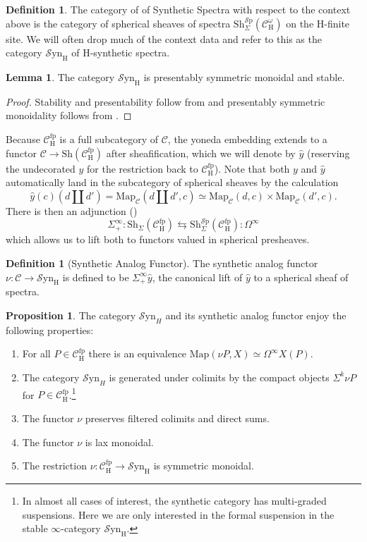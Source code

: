 \documentclass[10pt]{amsart}
\theoremstyle{definition}
\numberwithin{figure}{section}
\numberwithin{equation}{section}
\newtheorem{lemma}[figure]{Lemma}
\newtheorem{proposition}[figure]{Proposition}
\newtheorem{definition}[figure]{Definition}
\newcommand{\cC}{\mathcal{C}}
\theoremstyle{cited}
\newcommand{\Sp}{{\mathcal{S}\mathrm{p}}}
\newcommand{\Map}{\mathrm{Map}}
\newcommand{\Sh}{\mathrm{Sh}}
\newcommand{\fp}{\mathrm{fp}}
\newcommand{\Syn}{\mathcal{S}\mathrm{yn}}
\renewcommand{\H}{\mathrm{H}}
\begin{document}
\begin{definition}\label{def:synsp}
  The category of of Synthetic Spectra with respect to the context above is the category of spherical sheaves of spectra $\Sh^\Sp_\Sigma(\cC^\omega_\H)$ on the $\H$-finite site. We will often drop much of the context data and refer to this as the category $\Syn_\H$ of $\H$-synthetic spectra.
\end{definition}

\begin{lemma}\label{lem:synispsms}
  The category $\Syn_\H$ is presentably symmetric monoidal and stable.
\end{lemma}

\begin{proof}
  Stability and presentability follow from \cite[Corollary 2.13]{Pst22} and presentably symmetric monoidality follows from \cite[Proposition 2.30]{Pst22}.
\end{proof}

Because $\cC_\H^\fp$ is a full subcategory of $\cC$, the yoneda embedding extends to a functor $\cC\to \Sh(\cC_\H^\fp)$ after sheafification, which we will denote by $\hat y$ (reserving the undecorated $y$ for the restriction back to $\cC^\fp_\H$). Note that both $y$ and $\hat y$ automatically land in the subcategory of spherical sheaves by the calculation
\[
  \hat y(c)(d\amalg d')=\Map_{\cC}(d\amalg d', c)\simeq \Map_{\cC}(d, c)\times \Map_{\cC}(d', c).
\]
There is then an adjunction (\cite{Pst22})
\[
\Sigma^\infty_+:\Sh_\Sigma(\cC_\H^\fp) \leftrightarrows \Sh_\Sigma^\Sp(\cC_\H^\fp):\Omega^\infty
\]
which allows us to lift both to functors valued in spherical presheaves.

\begin{definition}[Synthetic Analog Functor]\label{def:synanalog}
  The synthetic analog functor $\nu:\cC\to \Syn_\H$ is defined to be $\Sigma_+^\infty \hat y$, the canonical lift of $\hat y$ to a spherical sheaf of spectra.
\end{definition}

\begin{proposition}\label{prop:analogprops}
   The category $\Syn_H$ and its synthetic analog functor enjoy the following properties:
   \begin{enumerate}
    \item For all $P\in \cC_\H^\fp$ there is an equivalence $\Map(\nu P, X)\simeq \Omega^\infty X(P)$.
    \item The category $\Syn_H$ is generated under colimits by the compact objects $\Sigma^{k}\nu P$ for $P\in \cC_\H^\fp$.\footnote{In almost all cases of interest, the synthetic category has multi-graded suspensions. Here we are only interested in the formal suspension in the stable $\infty$-category $\Syn_\H$.}
    \item The functor $\nu$ preserves filtered colimits and direct sums.
    \item The functor $\nu$ is lax monoidal.
    \item The restriction $\nu:\cC_\H^\fp\to \Syn_\H$ is symmetric monoidal.
   \end{enumerate}  
\end{proposition}
\end{document}
